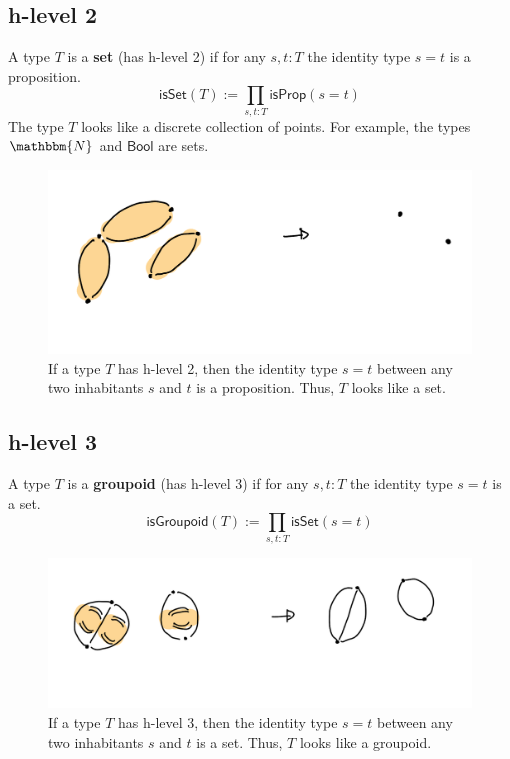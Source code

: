 \documentclass{amsart}
\theoremstyle{definition}
\newcommand{\N}{\mathbbm{N}}
\newcommand{\Bool}{\ensuremath{\mathsf{Bool}}}
\newcommand{\isProp}{\ensuremath{\mathsf{isProp}}}
\newcommand{\isSet}{\ensuremath{\mathsf{isSet}}}
\newcommand{\isGroupoid}{\ensuremath{\mathsf{isGroupoid}}}
\renewcommand{\emph}{\textbf}
\begin{document}
\subsection{h-level 2}\label{sec:h-level-2}
A type $T$ is a \emph{set} (has h-level 2) if for any $s, t : T$ the identity type $s = t$ is a proposition.
\[
    \isSet(T) := \prod_{s,t : T}\isProp(s = t)
\]
The type $T$ looks like a discrete collection of points.
For example, the types $\N$ and $\Bool$ are sets.
\begin{figure}[h]
    \centering
    \includegraphics[scale=0.5]{hlvl2.png}
    \caption{If a type $T$ has h-level 2, then the identity type $s = t$ between any two inhabitants $s$ and $t$ is a proposition.
    Thus, $T$ looks like a set.}
    \label{fig:h-level-2}
\end{figure}

\subsection{h-level 3}\label{sec:h-level-3}
A type $T$ is a \emph{groupoid} (has h-level 3) if for any $s, t : T$ the identity type $s = t$ is a set.
\[
    \isGroupoid(T) := \prod_{s, t : T}\isSet(s = t)
\]
\begin{figure}[h]
    \centering
    \includegraphics[scale=0.5]{hlvl3.png}
    \caption{If a type $T$ has h-level 3, then the identity type $s = t$ between any two inhabitants $s$ and $t$ is a set.
    Thus, $T$ looks like a groupoid.}
    \label{fig:h-level-3}
\end{figure}
\end{document}
